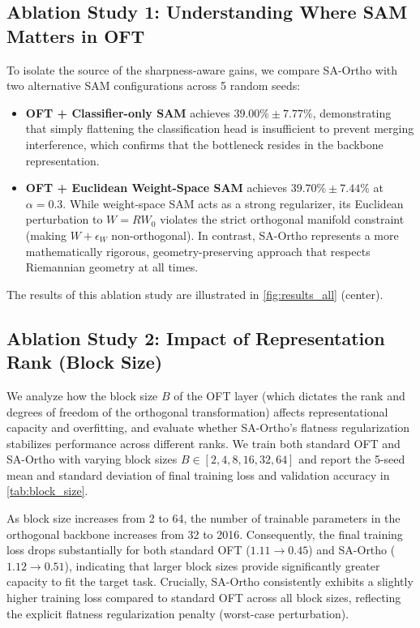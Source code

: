 \documentclass{article}
\theoremstyle{plain}
\theoremstyle{definition}
\theoremstyle{remark}
\begin{document}
\subsection{Ablation Study 1: Understanding Where SAM Matters in OFT}
To isolate the source of the sharpness-aware gains, we compare SA-Ortho with two alternative SAM configurations across 5 random seeds:
\begin{itemize}
  \item \textbf{OFT + Classifier-only SAM} achieves $39.00\% \pm 7.77\%$, demonstrating that simply flattening the classification head is insufficient to prevent merging interference, which confirms that the bottleneck resides in the backbone representation.
  \item \textbf{OFT + Euclidean Weight-Space SAM} achieves $39.70\% \pm 7.44\%$ at $\alpha=0.3$. While weight-space SAM acts as a strong regularizer, its Euclidean perturbation to $W = R W_0$ violates the strict orthogonal manifold constraint (making $W + \epsilon_W$ non-orthogonal). In contrast, SA-Ortho represents a more mathematically rigorous, geometry-preserving approach that respects Riemannian geometry at all times.
\end{itemize}

The results of this ablation study are illustrated in \cref{fig:results_all} (center).

\subsection{Ablation Study 2: Impact of Representation Rank (Block Size)}
We analyze how the block size $B$ of the OFT layer (which dictates the rank and degrees of freedom of the orthogonal transformation) affects representational capacity and overfitting, and evaluate whether SA-Ortho's flatness regularization stabilizes performance across different ranks. We train both standard OFT and SA-Ortho with varying block sizes $B \in [2, 4, 8, 16, 32, 64]$ and report the 5-seed mean and standard deviation of final training loss and validation accuracy in \cref{tab:block_size}.

As block size increases from 2 to 64, the number of trainable parameters in the orthogonal backbone increases from 32 to 2016. Consequently, the final training loss drops substantially for both standard OFT ($1.11 \rightarrow 0.45$) and SA-Ortho ($1.12 \rightarrow 0.51$), indicating that larger block sizes provide significantly greater capacity to fit the target task. Crucially, SA-Ortho consistently exhibits a slightly higher training loss compared to standard OFT across all block sizes, reflecting the explicit flatness regularization penalty (worst-case perturbation).
\end{document}
